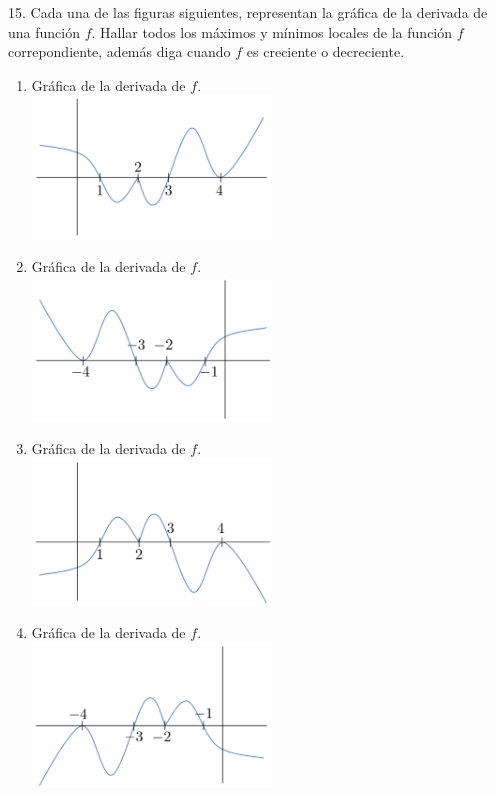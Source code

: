 \documentclass[12pt]{article}
\begin{document}
15. Cada una de las figuras siguientes, representan la gr\'afica de la derivada de una funci\'on $f$. Hallar todos los m\'aximos y m\'inimos locales de la funci\'on $f$ correpondiente, adem\'as diga cuando $f$ es creciente o decreciente.

\begin{enumerate}[\hspace{9px} a)]
    \item Gr\'afica de la derivada de $f$.\\
        \includegraphics[width=0.5\textwidth]{ejer-a}
    \item Gr\'afica de la derivada de $f$.\\
        \includegraphics[width=0.5\textwidth]{ejer-b}
    \item Gr\'afica de la derivada de $f$.\\
        \includegraphics[width=0.5\textwidth]{ejer-c}
    \item Gr\'afica de la derivada de $f$.\\
        \includegraphics[width=0.5\textwidth]{ejer-d}
\end{enumerate}
\end{document}
